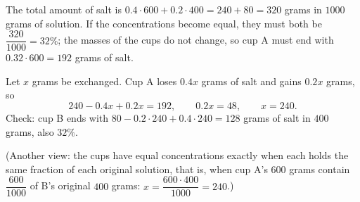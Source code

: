 The total amount of salt is $0.4\cdot600+0.2\cdot400=240+80=320$ grams in $1000$ grams of solution. If the concentrations become equal, they must both be $\dfrac{320}{1000}=32\%$; the masses of the cups do not change, so cup A must end with $0.32\cdot600=192$ grams of salt.

Let $x$ grams be exchanged. Cup A loses $0.4x$ grams of salt and gains $0.2x$ grams, so
\[240-0.4x+0.2x=192,\qquad 0.2x=48,\qquad x=\boxed{240}.\]
Check: cup B ends with $80-0.2\cdot240+0.4\cdot240=128$ grams of salt in $400$ grams, also $32\%$.

(Another view: the cups have equal concentrations exactly when each holds the same fraction of each original solution, that is, when cup A's $600$ grams contain $\dfrac{600}{1000}$ of B's original $400$ grams: $x=\dfrac{600\cdot400}{1000}=240$.)

